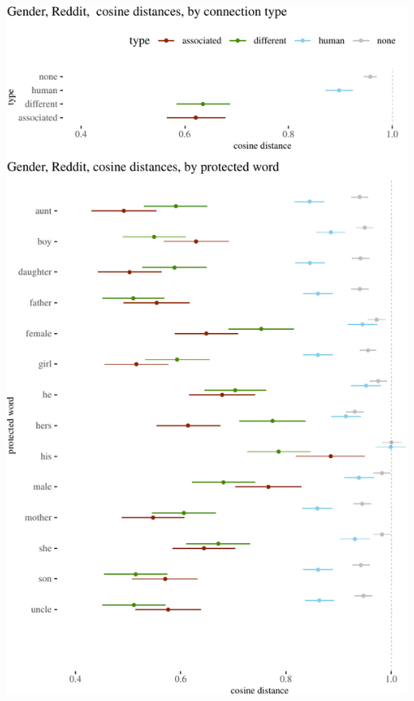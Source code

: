 \documentclass{clv3}
\begin{document}
\begin{center}\includegraphics[width=1\linewidth]{figures/resultsGenderReddita} \end{center}
\end{document}
